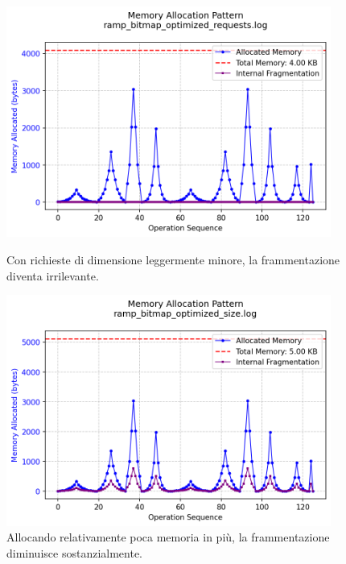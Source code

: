 \begin{figure}[H]
  \centering
  \begin{minipage}{0.5\textwidth}
    \centering
    \includegraphics[width=0.95\textwidth]{graphs/ramp_bitmap_optimized_requests.png}
    \caption{Con richieste di dimensione leggermente minore, la frammentazione diventa irrilevante.}
    \label{fig:ramp_bitmap_optimized_requests}
  \end{minipage}\hfill
  \begin{minipage}{0.5\textwidth}
    \centering
    \includegraphics[width=0.95\textwidth]{graphs/ramp_bitmap_optimized_size.png}
    \caption{Allocando relativamente poca memoria in più, la frammentazione diminuisce sostanzialmente.}
    \label{fig:ramp_bitmap_optimized_size}
  \end{minipage}
\end{figure}


